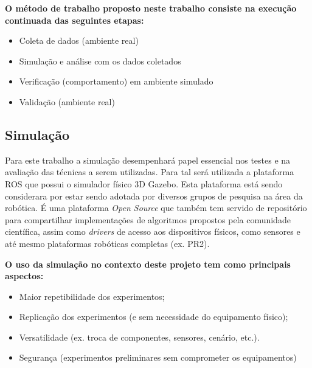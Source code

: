 \textbf{O método de trabalho proposto neste trabalho consiste na execução
continuada das seguintes etapas:}

\begin{itemize}
\item Coleta de dados (ambiente real)
\item Simulação e análise com os dados coletados
\item Verificação (comportamento) em ambiente simulado 
\item Validação (ambiente real)
\end{itemize}


\subsection{Simulação}

Para este trabalho a simulação desempenhará papel essencial nos testes e na
avaliação das técnicas a serem utilizadas. Para tal será utilizada a plataforma
ROS que possui o
simulador físico 3D Gazebo. Esta plataforma está sendo considerara por estar
sendo adotada por diversos grupos de pesquisa na área da robótica. É uma
plataforma \textit{Open Source} que também tem servido de repositório para
compartilhar implementações de algoritmos propostos pela comunidade científica,
assim como \textit{drivers} de acesso aos dispositivos físicos, como sensores e
até mesmo plataformas robóticas completas (ex.
PR2).


\textbf{O uso da simulação no contexto deste projeto tem como principais aspectos:}

\begin{itemize}
\item Maior repetibilidade dos experimentos;
\item Replicação dos experimentos (e sem necessidade do equipamento físico);
\item Versatilidade (ex. troca de componentes, sensores, cenário, etc.).
\item Segurança (experimentos preliminares sem comprometer os equipamentos)
\end{itemize}

